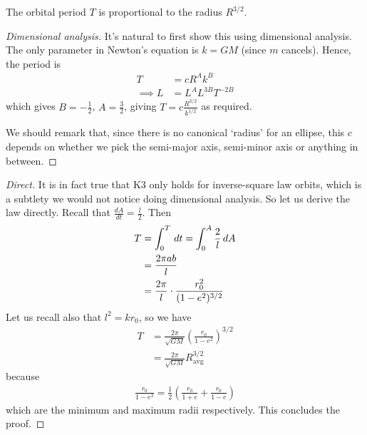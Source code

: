 \documentclass{../../template/note}
\begin{document}

    \begin{proposition}
        The orbital period \(T\) is proportional to the radius \(R^{3/2}\).
    \end{proposition}
    
    \begin{proof}[Dimensional analysis]
        It's natural to first show this using dimensional analysis. The only parameter in Newton's equation is \(k = GM\) (since \(m\) cancels). Hence, the period is
        \begin{align*}
            T &= cR^Ak^B \\
            \implies \si{L} &= \si{L^A L^{3B} T^{-2B}}
        \end{align*}
        which gives \(B = -\frac 1 2\), \(A = \frac 3 2\), giving \(T = c\frac{R^{3/2}}{k^{1/2}}\) as required.  
        
        We should remark that, since there is no canonical `radius' for an ellipse, this \(c\) depends on whether we pick the semi-major axis, semi-minor axis or anything in between.
    \end{proof}

    \begin{proof}[Direct]
        It is in fact true that K3 only holds for inverse-square law orbits, which is a subtlety we would not notice doing dimensional analysis. So let us derive the law directly. Recall that \(\frac{dA}{dt} = \frac l 2\). Then
        \begin{align*}
            T &= \int_0^T \,d{t} = \int_0^A \frac 2 l \,d{A} \\
            &= \frac{2\pi ab}{l} \\
            &= \frac{2\pi} l \cdot \frac{r_0^2}{(1-e^2)^{3/2}}
        \end{align*}
        Let us recall also that \(l^2 = kr_0\), so we have
        \begin{align*}
            T &= \frac{2\pi}{\sqrt{GM}}\left(\frac{r_0}{1-e^2}\right)^{3/2} \\
            &= \frac{2\pi}{\sqrt{GM}}R_\text{avg}^{3/2}
        \end{align*}
        because
        \begin{align*}
            \frac{r_0}{1-e^2} = \frac 1 2 \left(\frac{r_0}{1+e} + \frac{r_0}{1-e}\right)
        \end{align*}
        which are the minimum and maximum radii respectively. This concludes the proof.
    \end{proof}
    
\end{document}
